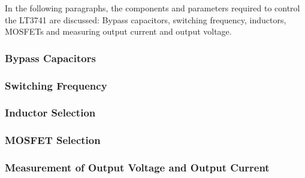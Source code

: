 In the following paragraphs, the components and parameters required to control
the LT3741  are discussed: Bypass capacitors, switching  frequency, inductors,
MOSFETs and measuring output current and output voltage.


\subsubsection{Bypass Capacitors}



\subsubsection{Switching Frequency}



\subsubsection{Inductor Selection}



\subsubsection{MOSFET Selection}



\subsubsection{Measurement of Output Voltage and Output Current}

